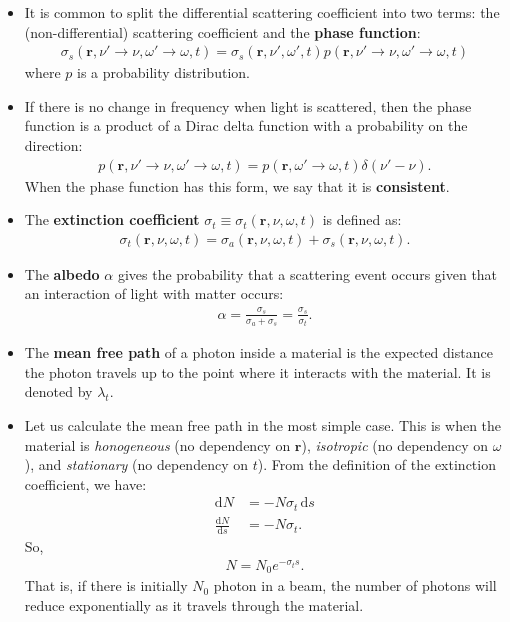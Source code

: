 \documentclass[10pt]{article}
\newcommand{\dee}{\mathrm{d}}
\newcommand{\ve}[1]{\mathbf{#1}}
\newcommand{\ra}{\rightarrow}
\begin{document}
\begin{itemize}
    \item It is common to split the differential scattering coefficient into two terms: the (non-differential) scattering coefficient and the \textbf{phase function}:
    \begin{align*}
      \sigma_s(\ve{r}, \nu' \ra \nu, \omega' \ra \omega, t) = \sigma_s(\ve{r}, \nu', \omega', t) p(\ve{r}, \nu' \ra \nu, \omega' \ra \omega, t)
    \end{align*}
    where $p$ is a probability distribution.

    \item If there is no change in frequency when light is scattered, then the phase function is a product of a Dirac delta function with a probability on the direction:
    \begin{align*}
      p(\ve{r}, \nu' \ra \nu, \omega' \ra \omega, t) = p(\ve{r}, \omega' \ra \omega, t) \delta(\nu' - \nu).
    \end{align*}
    When the phase function has this form, we say that it is \textbf{consistent}.

    \item The \textbf{extinction coefficient} $\sigma_t \equiv \sigma_t(\ve{r}, \nu, \omega, t)$ is defined as:
    \begin{align*}
      \sigma_t(\ve{r},\nu, \omega, t) = \sigma_a(\ve{r},\nu, \omega, t) + \sigma_s(\ve{r},\nu, \omega, t).
    \end{align*}

    \item The \textbf{albedo} $\alpha$ gives the probability that a scattering event occurs given that an interaction of light with matter occurs:
    \begin{align*}
      \alpha = \frac{\sigma_s}{\sigma_a + \sigma_s} = \frac{\sigma_s}{\sigma_t}.
    \end{align*}

    \item The \textbf{mean free path} of a photon inside a material is the expected distance the photon travels up to the point where it interacts with the material. It is denoted by $\lambda_t$.

    \item Let us calculate the mean free path in the most simple case. This is when the material is \emph{honogeneous} (no dependency on $\ve{r}$), \emph{isotropic} (no dependency on $\omega$), and \emph{stationary} (no dependency on $t$).  From the definition of the extinction coefficient, we have:
    \begin{align*}
      \dee N &= - N \sigma_t\, \dee s \\
      \frac{\dee N}{\dee s} &= -N \sigma_t.
    \end{align*}
    So,
    \begin{align*}
      N = N_0 e^{-\sigma_t s}.
    \end{align*}
    That is, if there is initially $N_0$ photon in a beam, the number of photons will reduce exponentially as it travels through the material. 


\end{itemize}
\end{document}
